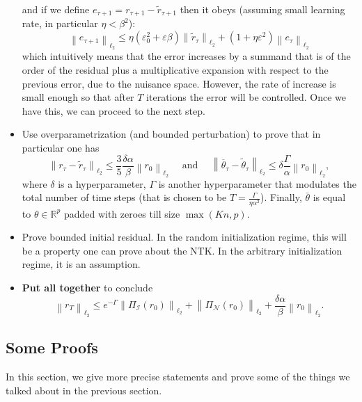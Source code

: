 \documentclass[a4paper]{article}
\let\temp\epsilon
\let\epsilon\varepsilon
\let\varepsilon\temp
\newcommand{\R}{\mathbb{R}}
\begin{document}
\begin{itemize}
\[        \] 
        and if we define $e_{\tau+1}=r_{\tau+1}-\widetilde{r}_{\tau+1}$ then it obeys (assuming small learning rate, in particular $\eta<\beta^2$):
        \[
        \left\|e_{\tau+1}\right\|_{\ell_{2}} \leq \eta\left(\epsilon_{0}^{2}+\epsilon \beta\right)\left\|\widetilde{r}_{\tau}\right\|_{\ell_{2}}+\left(1+\eta \epsilon^{2}\right)\left\|e_{\tau}\right\|_{\ell_{2}}
        \] 
        which intuitively means that the error increases by a summand that is of the order of the residual plus a multiplicative expansion with respect to the previous error, due to the nuisance space. However, the rate of increase is small enough so that after $T$ iterations the error will be controlled. Once we have this, we can proceed to the next step.
    \item Use overparametrization (and bounded perturbation) to prove that in particular one has
        \[
        \left\|r_{\tau}-\widetilde{r}_{\tau}\right\|_{\ell_{2}} \leq \frac{3}{5} \frac{\delta \alpha}{\beta}\left\|r_{0}\right\|_{\ell_{2}} \quad \text { and } \quad\left\|\overline{\theta}_{\tau}-\widetilde{\theta}_{\tau}\right\|_{\ell_{2}} \leq \delta \frac{\Gamma}{\alpha}\left\|r_{0}\right\|_{\ell_{2}},
        \] 
        where $\delta$ is a hyperparameter, $\Gamma$ is another hyperparameter that modulates the total number of time steps (that is chosen to be $T = \frac{\Gamma}{\eta \alpha^2}$). Finally, $\bar{\theta}$ is equal to $\theta\in\R^{p}$ padded with zeroes till size $\max(Kn,p)$.
    \item Prove bounded initial residual. In the random initialization regime, this will be a property one can prove about the NTK. In the arbitrary initialization regime, it is an assumption.
    \item \textbf{Put all together} to conclude
        \[
        \left\|r_{T}\right\|_{\ell_{2}} \leq e^{-\Gamma}\left\|\Pi_{\mathcal{I}}\left(r_{0}\right)\right\|_{\ell_{2}}+\left\|\Pi_{\mathcal{N}}\left(r_{0}\right)\right\|_{\ell_{2}}+\frac{\delta \alpha}{\beta}\left\|r_{0}\right\|_{\ell_{2}}.
        \] 
    
        
\end{itemize}



\subsection{Some Proofs}
\label{sec:some-proofs}

In this section, we give more precise statements and prove some of the
things we talked about in the previous section.
\end{document}
